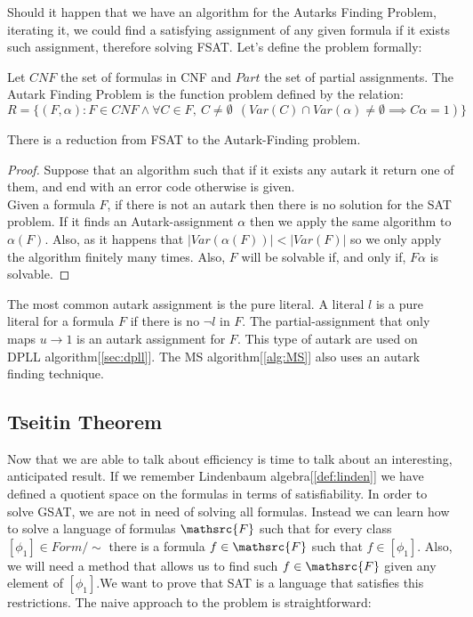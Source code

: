 Should it happen that we have an algorithm for the Autarks Finding Problem, iterating it, we could find a satisfying assignment of any given formula if it exists such assignment, therefore solving FSAT.  Let's define the problem formally:

\begin{definition}
  Let $CNF$ the set of formulas in CNF and $Part$ the set of partial assignments. The Autark Finding Problem is the function problem defined by the relation:
  $$R = \{(F,\alpha): F \in CNF\wedge \forall C \in F,\ C\ne \emptyset\ \ ( Var(C)\cap Var(\alpha)\ne\emptyset \implies C\alpha=1 )\}$$
\end{definition}

\begin{proposition}
  There is a reduction from FSAT to the Autark-Finding problem.
\end{proposition}
\begin{proof} Suppose that an algorithm such that if it exists any autark it return one of them, and end with an error code otherwise is given.  \\

    Given a formula $F$, if there is not an autark then there is no solution for the SAT problem. If it finds an Autark-assignment $\alpha$ then we apply the same algorithm to $\alpha(F)$. Also, as it happens that $|Var(\alpha(F))|<|Var(F)|$ so we only apply the algorithm finitely many times. Also, $F$ will be solvable if, and only if, $F\alpha$ is solvable.
\end{proof}


The most common autark assignment is the pure literal. A literal $l$ is a pure literal for a formula $F$ if there is no $\neg l$ in $F$. The partial-assignment that only maps $u\to 1$ is an autark assignment for $F$. This type of autark are used on DPLL algorithm[\ref{sec:dpll}]. The MS algorithm[\ref{alg:MS}] also uses an autark finding technique.



\subsection{Tseitin Theorem}
Now that we are able to talk about efficiency is time to talk about an interesting, anticipated result. If we remember Lindenbaum algebra[\ref{def:linden}] we have defined a quotient space on the formulas in terms of satisfiability. In order to solve GSAT, we are not in need of solving all formulas.  Instead we can learn how to solve a language of formulas $\mathsrc{F}$ such that for every class $[\phi_1]\in Form/\sim$ there  is a formula $f\in\mathsrc{F}$ such that $f \in [\phi_1]$. Also, we will need a method that allows us to find such $f\in\mathsrc{F}$ given any element of $[\phi_1]$.We want to prove that SAT is a language that satisfies this restrictions. The naive approach to the problem is straightforward:\\

